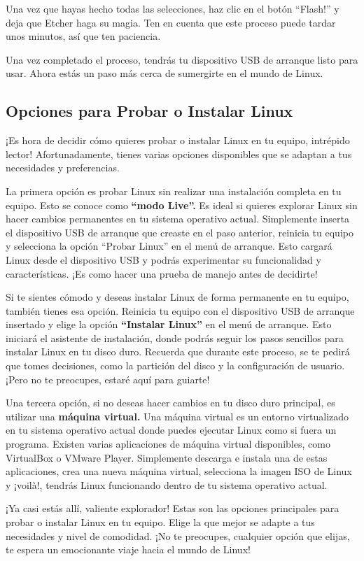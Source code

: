 \documentclass[
  letterpaper,
  DIV=11,
  numbers=noendperiod]{scrartcl}
\begin{document}
Una vez que hayas hecho todas las selecciones, haz clic en el botón
``Flash!'' y deja que Etcher haga su magia. Ten en cuenta que este
proceso puede tardar unos minutos, así que ten paciencia.

Una vez completado el proceso, tendrás tu dispositivo USB de arranque
listo para usar. Ahora estás un paso más cerca de sumergirte en el mundo
de Linux.

\hypertarget{opciones-para-probar-o-instalar-linux}{%
\subsection{Opciones para Probar o Instalar
Linux}\label{opciones-para-probar-o-instalar-linux}}

¡Es hora de decidir cómo quieres probar o instalar Linux en tu equipo,
intrépido lector! Afortunadamente, tienes varias opciones disponibles
que se adaptan a tus necesidades y preferencias.

La primera opción es probar Linux sin realizar una instalación completa
en tu equipo. Esto se conoce como \textbf{``modo Live''.} Es ideal si
quieres explorar Linux sin hacer cambios permanentes en tu sistema
operativo actual. Simplemente inserta el dispositivo USB de arranque que
creaste en el paso anterior, reinicia tu equipo y selecciona la opción
``Probar Linux'' en el menú de arranque. Esto cargará Linux desde el
dispositivo USB y podrás experimentar su funcionalidad y
características. ¡Es como hacer una prueba de manejo antes de decidirte!

Si te sientes cómodo y deseas instalar Linux de forma permanente en tu
equipo, también tienes esa opción. Reinicia tu equipo con el dispositivo
USB de arranque insertado y elige la opción \textbf{``Instalar Linux''}
en el menú de arranque. Esto iniciará el asistente de instalación, donde
podrás seguir los pasos sencillos para instalar Linux en tu disco duro.
Recuerda que durante este proceso, se te pedirá que tomes decisiones,
como la partición del disco y la configuración de usuario. ¡Pero no te
preocupes, estaré aquí para guiarte!

Una tercera opción, si no deseas hacer cambios en tu disco duro
principal, es utilizar una \textbf{máquina virtual.} Una máquina virtual
es un entorno virtualizado en tu sistema operativo actual donde puedes
ejecutar Linux como si fuera un programa. Existen varias aplicaciones de
máquina virtual disponibles, como VirtualBox o VMware Player.
Simplemente descarga e instala una de estas aplicaciones, crea una nueva
máquina virtual, selecciona la imagen ISO de Linux y ¡voilà!, tendrás
Linux funcionando dentro de tu sistema operativo actual.

¡Ya casi estás allí, valiente explorador! Estas son las opciones
principales para probar o instalar Linux en tu equipo. Elige la que
mejor se adapte a tus necesidades y nivel de comodidad. ¡No te
preocupes, cualquier opción que elijas, te espera un emocionante viaje
hacia el mundo de Linux!


\printbibliography
\end{document}
